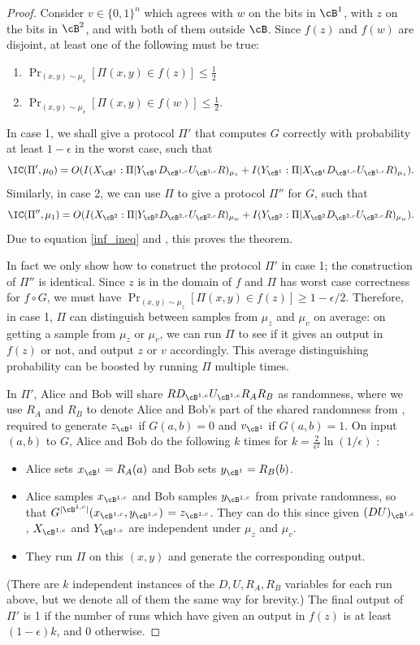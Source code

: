 \begin{proof}
Consider $v \in \{0,1\}^n$ which agrees with $w$ on the bits in $\cB^1$, with $z$ on the bits in $\cB^2$, and with both of them outside $\cB$. Since $f(z)$ and $f(w)$ are disjoint, at least one of the following must be true:
\begin{enumerate}
    \item $\Pr_{(x,y)\sim \mu_v}[\Pi(x,y) \in f(z)] \leq \frac{1}{2}$
    \item $\Pr_{(x,y)\sim \mu_v}[\Pi(x,y) \in f(w)] \leq \frac{1}{2}$.
\end{enumerate}
In case 1, we shall give a protocol $\Pi'$ that computes $G$ correctly with probability at least $1-\epsilon$ in the worst case, such that
\[\IC(\Pi', \mu_0) = O( I(X_{\cB^1}:\Pi|Y_{\cB^1}D_{\cB^{1,c}}U_{\cB^{1,c}}R)_{\mu_z} + I(Y_{\cB^1}:\Pi|X_{\cB^1}D_{\cB^{1,c}}U_{\cB^{1,c}}R)_{\mu_z}).\]
Similarly, in case 2, we can use $\Pi$ to give a protocol $\Pi''$ for $G$, such that
\[ \IC(\Pi'', \mu_1) = O(I(X_{\cB^2}:\Pi|Y_{\cB^2}D_{\cB^{2,c}}U_{\cB^{2,c}}R)_{\mu_w} + I(Y_{\cB^2}:\Pi|X_{\cB^2}D_{\cB^{2,c}}U_{\cB^{2,c}}R)_{\mu_w}).\]
Due to equation \eqref{inf_ineq} and , this proves the theorem.

In fact we only show how to construct the protocol $\Pi'$ in case 1; the construction of $\Pi''$ is identical. Since $z$ is in the domain of $f$ and $\Pi$ has worst case correctness for $f\circ G$, we must have $\Pr_{(x,y)\sim\mu_z}[\Pi(x,y) \in f(z)] \geq 1-\epsilon/2$. Therefore, in case 1, $\Pi$ can distinguish between samples from $\mu_z$ and $\mu_v$ on average: on getting a sample from $\mu_z$ or $\mu_v$, we can run $\Pi$ to see if it gives an output in $f(z)$ or not, and output $z$ or $v$ accordingly. This average distinguishing probability can be boosted by running $\Pi$ multiple times. 

In $\Pi'$, Alice and Bob will share $RD_{\cB^{1,c}}U_{\cB^{1,c}}R_AR_B$ as randomness, where we use $R_A$ and $R_B$ to denote Alice and Bob's part of the shared randomness from  , required to generate $z_{\cB^1}$ if $G(a,b)=0$ and $v_{\cB^1}$ if $G(a,b)=1$. On input $(a,b)$ to $G$, Alice and Bob do the following $k$ times for $k=\frac{2}{\epsilon^2}\ln(1/\epsilon)$ :
\begin{itemize}
\item Alice sets $x_{\cB^1} = R_A(a)$ and Bob sets $y_{\cB^1} = R_B(b)$.
\item Alice samples $x_{\cB^{1,c}}$ and Bob samples $y_{\cB^{1,c}}$ from private randomness, so that $G^{|\cB^{1,c}|}(x_{\cB^{1,c}},y_{\cB^{1,c}})$ $= z_{\cB^{1,c}}$. They can do this since given $(DU)_{\cB^{1,c}}$, $X_{\cB^{1,c}}$ and $Y_{\cB^{1,c}}$ are independent under $\mu_z$ and $\mu_v$.
\item They run $\Pi$ on this $(x,y)$ and generate the corresponding output.
\end{itemize}
(There are $k$ independent instances of the $D, U, R_A, R_B$ variables for each run above, but we denote all of them the same way for brevity.) The final output of $\Pi'$ is 1 if the number of runs which have given an output in $f(z)$ is at least $(1-\epsilon)k$, and 0 otherwise.


\end{proof}
